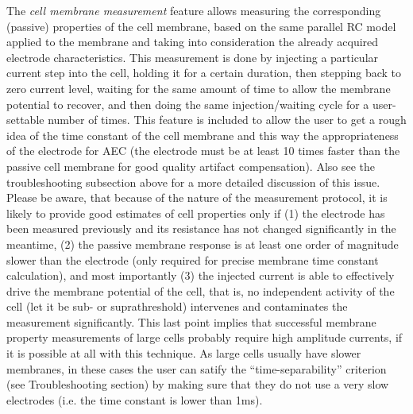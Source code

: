 \documentclass{article}
\begin{document}
The \emph{cell membrane measurement} feature allows measuring the
corresponding (passive) properties of the cell membrane, based on the
same parallel RC model applied to the membrane and taking into
consideration the already acquired electrode characteristics. This
measurement is done by injecting a particular current step into the
cell, holding it for a certain duration, then stepping back to zero
current level, waiting for the same amount of time to allow the
membrane potential to recover, and then doing the same
injection/waiting cycle for a user-settable number of times. This
feature is included to allow the user to get a rough idea of the
time constant of the cell membrane and this way the appropriateness of
the electrode for AEC (the electrode must be at least 10 times faster
than the passive cell membrane for good quality artifact compensation).
Also see the troubleshooting subsection above for a more detailed
discussion of this issue. Please be aware, that because of the nature
of the measurement protocol, it is likely to provide good estimates of
cell properties only if (1) the electrode has been measured previously and its
resistance has not changed significantly in the meantime, (2) the passive
membrane response is at least one order of magnitude slower than the
electrode (only required for precise membrane time constant
calculation), and most importantly (3) the injected current is able to
effectively drive the membrane potential of the cell, that is, no
independent activity of the cell (let it be sub- or suprathreshold)
intervenes and contaminates the measurement significantly. This last point
implies that successful membrane property measurements of large cells
probably require high amplitude currents, if it is possible at all
with this technique. As large cells usually have slower membranes, in
these cases the user can satify the ``time-separability'' criterion
(see Troubleshooting section) by making sure that they do not use a
very slow electrodes (i.e. the time constant is lower than 1ms).
\end{document}
